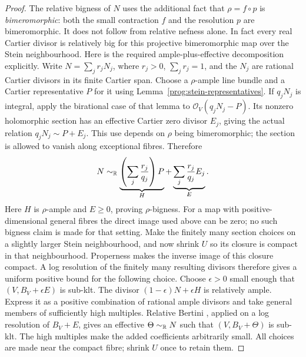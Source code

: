 \begin{proof}
The relative bigness of $N$ uses the additional fact that
$\rho=f\circ p$ is \emph{bimeromorphic}: both the small contraction
$f$ and the resolution $p$ are bimeromorphic. It does not follow from
relative nefness alone. In fact every real Cartier divisor is relatively
big for this projective bimeromorphic map over the Stein neighbourhood.
Here is the required ample-plus-effective decomposition explicitly.
Write $N=\sum_j r_jN_j$, where $r_j>0$, $\sum_jr_j=1$, and the $N_j$
are rational Cartier divisors in its finite Cartier span. Choose a
$\rho$-ample line bundle and a Cartier representative
$P$ for it using Lemma~\ref{prog:stein-representatives}.
If $q_jN_j$ is integral, apply the birational case of that lemma to
$\mathcal O_V(q_jN_j-P)$. Its nonzero holomorphic section has an
effective Cartier zero divisor $E_j$, giving the actual relation
$q_jN_j\sim P+E_j$. This use depends on $\rho$ being bimeromorphic;
the section is allowed to vanish along exceptional fibres. Therefore
\[
 N\sim_{\mathbb R}
 \underbrace{\left(\sum_j\frac{r_j}{q_j}\right)P}_{H}
 +\underbrace{\sum_j\frac{r_j}{q_j}E_j}_{E}.
\]
Here $H$ is $\rho$-ample and $E\geq0$, proving $\rho$-bigness.
For a map with positive-dimensional general fibres the direct image
used above can be zero; no such bigness claim is made for that setting.
Make the finitely many section choices on a slightly larger Stein
neighbourhood, and now shrink $U$ so its closure is compact in that
neighbourhood. Properness makes the inverse image of this closure
compact. A log resolution of the finitely many resulting divisors
therefore gives a uniform positive bound for the following choice.
Choose $\epsilon>0$ small enough that $(V,B_V+\epsilon E)$ is sub-klt.
The divisor $(1-\epsilon)N+\epsilon H$ is relatively ample. Express it
as a positive combination of rational ample divisors and take general
members of sufficiently high multiples. Relative Bertini
\cite[Theorem~2.20]{DHP}, applied on a log resolution of $B_V+E$,
gives an effective $\Theta\sim_{\mathbb R}N$ such that $(V,B_V+\Theta)$ is
sub-klt. The high multiples make the added coefficients arbitrarily
small. All choices are made near the compact fibre; shrink $U$ once
to retain them.


\end{proof}
